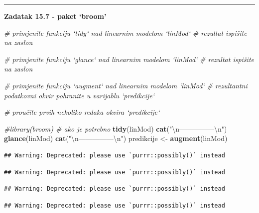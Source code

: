 \documentclass[]{book}
\newenvironment{Shaded}{\begin{snugshade}}{\end{snugshade}}
\newcommand{\KeywordTok}[1]{\textcolor[rgb]{0.13,0.29,0.53}{\textbf{#1}}}
\newcommand{\CharTok}[1]{\textcolor[rgb]{0.31,0.60,0.02}{#1}}
\newcommand{\StringTok}[1]{\textcolor[rgb]{0.31,0.60,0.02}{#1}}
\newcommand{\CommentTok}[1]{\textcolor[rgb]{0.56,0.35,0.01}{\textit{#1}}}
\newcommand{\NormalTok}[1]{#1}
\theoremstyle{definition}
\theoremstyle{definition}
\theoremstyle{definition}
\theoremstyle{remark}
\begin{document}
\begin{center}\rule{0.5\linewidth}{\linethickness}\end{center}

\textbf{Zadatak 15.7 - paket `broom'}

\begin{Shaded}
\begin{Highlighting}[]
\CommentTok{# primjenite funkciju `tidy` nad linearnim modelom `linMod`}
\CommentTok{# rezultat ispišite na zaslon}

\CommentTok{# primjenite funkciju `glance` nad linearnim modelom `linMod`}
\CommentTok{# rezultat ispišite na zaslon}

\CommentTok{# primjenite funkciju `augment` nad linearnim modelom `linMod`}
\CommentTok{# rezultantni podatkovni okvir pohranite u varijablu `predikcije`}

\CommentTok{# proučite prvih nekoliko redaka okvira `predikcije`}
\end{Highlighting}
\end{Shaded}

\begin{Shaded}
\begin{Highlighting}[]
\CommentTok{#library(broom)   # ako je potrebno}
\KeywordTok{tidy}\NormalTok{(linMod)}
\KeywordTok{cat}\NormalTok{(}\StringTok{"}\CharTok{\textbackslash{}n}\StringTok{---------------}\CharTok{\textbackslash{}n}\StringTok{"}\NormalTok{)}
\KeywordTok{glance}\NormalTok{(linMod)}
\KeywordTok{cat}\NormalTok{(}\StringTok{"}\CharTok{\textbackslash{}n}\StringTok{---------------}\CharTok{\textbackslash{}n}\StringTok{"}\NormalTok{)}
\NormalTok{predikcije <-}\StringTok{ }\KeywordTok{augment}\NormalTok{(linMod)}
\end{Highlighting}
\end{Shaded}

\begin{verbatim}
## Warning: Deprecated: please use `purrr::possibly()` instead
\end{verbatim}

\begin{verbatim}
## Warning: Deprecated: please use `purrr::possibly()` instead
\end{verbatim}

\begin{verbatim}
## Warning: Deprecated: please use `purrr::possibly()` instead
\end{verbatim}

\begin{verbatim}
## Warning: Deprecated: please use `purrr::possibly()` instead
\end{verbatim}
\end{document}

